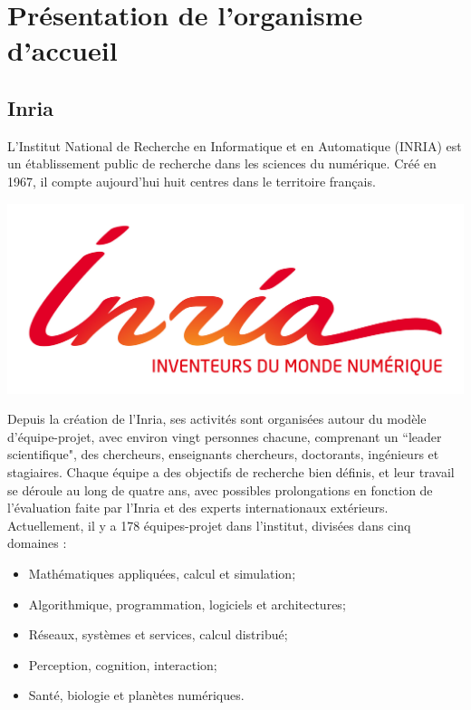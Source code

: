 \section{Présentation de l'organisme d'accueil}
\label{sec:organisme}

\subsection{Inria}
\label{subsec:inria}

\indent L'Institut National de Recherche en Informatique et en Automatique (INRIA) est un établissement public de recherche dans les sciences du numérique. Créé en 1967, il compte aujourd'hui huit centres dans le territoire français. 

\begingroup
\centering
\includegraphics[scale=.3]{figures/logos/Inria.jpg}
\endgroup

\indent Depuis la création de l'Inria, ses activités sont organisées autour du modèle d'équipe-projet, avec environ vingt personnes chacune, comprenant un ``leader scientifique", des chercheurs, enseignants chercheurs, doctorants, ingénieurs et stagiaires. Chaque équipe a des objectifs de recherche bien définis, et leur travail se déroule au long de quatre ans, avec possibles prolongations en fonction de l'évaluation faite par l'Inria et des experts internationaux extérieurs. Actuellement, il y a 178 équipes-projet dans l'institut, divisées dans cinq domaines : 

\begin{itemize}
	\item Mathématiques appliquées, calcul et simulation;
	\item Algorithmique, programmation, logiciels et architectures;
	\item Réseaux, systèmes et services, calcul distribué;
	\item Perception, cognition, interaction;
	\item Santé, biologie et planètes numériques.
\end{itemize}

